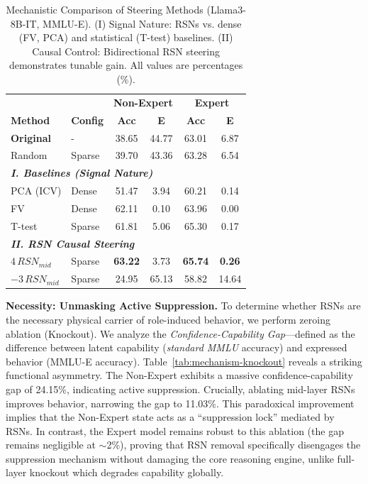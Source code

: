 \documentclass{article}
\begin{document}
\begin{table}[htbp]
\centering
\small
\caption{Mechanistic Comparison of Steering Methods (Llama3-8B-IT, MMLU-E). (I) Signal Nature: RSNs vs. dense (FV, PCA) and statistical (T-test) baselines. (II) Causal Control: Bidirectional RSN steering demonstrates tunable gain. All values are percentages (\%).}
\label{tab:mechanism-steering}
\setlength{\tabcolsep}{2pt}
\renewcommand{\arraystretch}{1.2}
\begin{tabular}{l l cc cc}
\toprule
& & \multicolumn{2}{c}{\textbf{Non-Expert }} 
& \multicolumn{2}{c}{\textbf{Expert}} \\
\textbf{Method} & \textbf{Config} 
& \textbf{Acc} & \textbf{E} 
& \textbf{Acc} & \textbf{E} \\
\midrule
\textbf{Original} & - 
& 38.65 & 44.77 
& 63.01 & 6.87 \\
Random & Sparse 
& 39.70 & 43.36 
& 63.28 & 6.54 \\
\midrule
\multicolumn{6}{l}{\textit{\textbf{I. Baselines (Signal Nature)}}} \\
PCA (ICV) & Dense 
& 51.47 & 3.94 
& 60.21 & 0.14 \\
FV & Dense 
& 62.11 & 0.10 
& 63.96 & 0.00 \\
T-test & Sparse 
& 61.81 & 5.06 
& 65.30 & 0.17 \\
\midrule
\multicolumn{6}{l}{\textit{\textbf{II. RSN Causal Steering}}} \\
$4\,RSN_{mid}$& Sparse & \textbf{63.22} & 3.73 
& \textbf{65.74} & \textbf{0.26} \\
$-3\,RSN_{mid}$& Sparse & 24.95 & 65.13 
& 58.82 & 14.64 \\
\bottomrule
\end{tabular}
\end{table}

\textbf{Necessity: Unmasking Active Suppression.}
To determine whether RSNs are the necessary physical carrier of role-induced behavior, we perform zeroing ablation (Knockout). We analyze the \emph{Confidence-Capability Gap}—defined as the difference between latent capability (\emph{standard MMLU} accuracy) and expressed behavior (MMLU-E accuracy). Table~\ref{tab:mechanism-knockout} reveals a striking functional asymmetry. The Non-Expert exhibits a massive confidence-capability gap of 24.15\%, indicating active suppression. Crucially, ablating mid-layer RSNs improves behavior, narrowing the gap to 11.03\%. This paradoxical improvement implies that the Non-Expert state acts as a ``suppression lock'' mediated by RSNs. In contrast, the Expert model remains robust to this ablation (the gap remains negligible at $\sim$2\%), proving that RSN removal specifically disengages the suppression mechanism without damaging the core reasoning engine, unlike full-layer knockout which degrades capability globally.
\end{document}
